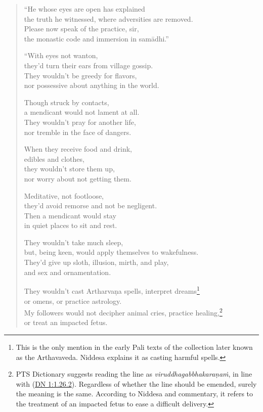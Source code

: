 \documentclass[12pt,openany]{book}%
\begin{document}
\begin{verse}
“He whose eyes are open has explained \\
the truth he witnessed, where adversities are removed. \\
Please now speak of the practice, sir, \\
the monastic code and immersion in \textsanskrit{samādhi}.” 

“With eyes not wanton, \\
they’d turn their ears from village gossip. \\
They wouldn’t be greedy for flavors, \\
nor possessive about anything in the world. 

Though struck by contacts, \\
a mendicant would not lament at all. \\
They wouldn’t pray for another life, \\
nor tremble in the face of dangers. 

When they receive food and drink, \\
edibles and clothes, \\
they wouldn’t store them up, \\
nor worry about not getting them. 

Meditative, not footloose, \\
they’d avoid remorse and not be negligent. \\
Then a mendicant would stay \\
in quiet places to sit and rest. 

They wouldn’t take much sleep, \\
but, being keen, would apply themselves to wakefulness. \\
They’d give up sloth, illusion, mirth, and play, \\
and sex and ornamentation. 

They wouldn’t cast \textsanskrit{Artharvaṇa} spells, interpret dreams\footnote{This is the only mention in the early Pali texts of the collection later known as the Arthavaveda. Niddesa explains it as casting harmful spells. } \\
or omens, or practice astrology. \\
My followers would not decipher animal cries, practice healing,\footnote{PTS Dictionary suggests reading the line as \textit{\textsanskrit{viruddhagabbhakaraṇaṁ}}, in line with (\href{https://suttacentral.net/dn1/en/sujato\#1.26.2}{DN 1:1.26.2}). Regardless of whether the line should be emended, surely the meaning is the same. According to Niddesa and commentary, it refers to the treatment of an impacted fetus to ease a difficult delivery. } \\
or treat an impacted fetus. 


\end{verse}
\end{document}
